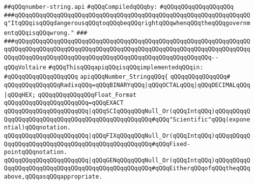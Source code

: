 \label{src/lib/std/src/number-string.api}
\verb|##qQQqnumber-string.api|\newline
\newline
\verb|#qQQqCompiledqQQqby:|\newline
\verb|#qQQqqQQqqQQqqQQqqQQq|\newline
\newline
\newline
\newline
\verb|###qQQqqQQqqQQqqQQqqQQqqQQqqQQqqQQqqQQqqQQqqQQqqQQqqQQqqQQqqQQqqQQqqQQq"ItqQQqisqQQqdangerousqQQqtoqQQqbeqQQqrightqQQqwhenqQQqtheqQQqgovernmentqQQqisqQQqwrong."|\newline
\verb|###|\newline
\verb|###qQQqqQQqqQQqqQQqqQQqqQQqqQQqqQQqqQQqqQQqqQQqqQQqqQQqqQQqqQQqqQQqqQQqqQQqqQQqqQQqqQQqqQQqqQQqqQQqqQQqqQQqqQQqqQQqqQQqqQQqqQQqqQQqqQQqqQQqqQQqqQQqqQQqqQQqqQQqqQQqqQQqqQQqqQQqqQQqqQQqqQQqqQQqqQQqqQQq--qQQqVoltaire|\newline
\newline
\newline
\verb|#qQQqThisqQQqapiqQQqisqQQqimplementedqQQqin:|\newline
\verb|#qQQqqQQqqQQqqQQqqQQq|\newline
\newline
\verb|apiqQQqNumber_StringqQQq{|\newline
\verb|qQQqqQQqqQQqqQQq#|\newline
\verb|qQQqqQQqqQQqqQQqRadixqQQq=qQQqBINARYqQQq|\verb#|qQQqOCTALqQQq|qQQqDECIMALqQQq|qQQqHEX;#\newline
\newline
\verb|qQQqqQQqqQQqqQQqFloat_Format|\newline
\verb|qQQqqQQqqQQqqQQqqQQqqQQq=qQQqEXACT|\newline
\verb|qQQqqQQqqQQqqQQqqQQqqQQq|\verb#|qQQqSCIqQQqqQQqNull_Or(qQQqIntqQQq)qQQqqQQqqQQqqQQqqQQqqQQqqQQqqQQqqQQqqQQqqQQqqQQqqQQq#\verb|#qQQq"Scientific"qQQq(exponential)qQQqnotation.|\newline
\verb|qQQqqQQqqQQqqQQqqQQqqQQq|\verb#|qQQqFIXqQQqqQQqNull_Or(qQQqIntqQQq)qQQqqQQqqQQqqQQqqQQqqQQqqQQqqQQqqQQqqQQqqQQqqQQqqQQq#\verb|#qQQqFixed-pointqQQqnotation.|\newline
\verb|qQQqqQQqqQQqqQQqqQQqqQQq|\verb#|qQQqGENqQQqqQQqNull_Or(qQQqIntqQQq)qQQqqQQqqQQqqQQqqQQqqQQqqQQqqQQqqQQqqQQqqQQqqQQqqQQq#\verb|#qQQqEitherqQQqofqQQqtheqQQqabove,qQQqasqQQqappropriate.|\newline
